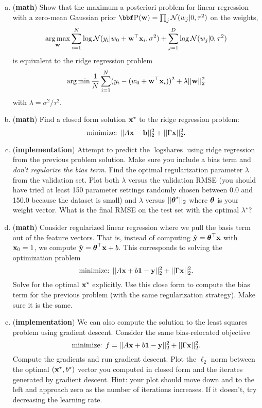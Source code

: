\documentclass[12pt,letterpaper,fleqn]{hmcpset}
\begin{document}
\begin{enumerate}[(a)]
    \item (\textbf{math}) Show that the maximum a posteriori problem for
        linear regression with a zero-mean Gaussian prior $\PP(\ww) = \prod_j
        \Nc(w_j | 0, \tau^2)$ on the weights,
        \[
            \operatorname*{arg\,max}_{\bf w} \sum_{i=1}^N \log{\cal N}(y_i | w_0 + {\bf w}^\top{\bf x}_i, \sigma^2) + \sum_{j=1}^D \log{\cal N}(w_j | 0, \tau^2)
        \]
        is equivalent to the ridge regression problem
        \[
            \operatorname*{arg\,min} \frac{1}{N}\sum_{i=1}^N (y_i - (w_0 + {\bf w}^\top{\bf x}_i))^2 + \lambda ||{\bf w}||_2^2
        \]
        with $\lambda = \sigma^2 / \tau^2$.
    \item (\textbf{math}) Find a closed form solution ${\bf x}^\star$ to the ridge regression
        problem:
        \[
            \text{minimize: } ||A{\bf x} - {\bf b}||_2^2 + ||\Gamma{\bf x}||_2^2.
        \]
    \item (\textbf{implementation}) Attempt to predict the $\log\text{shares}$ using ridge
        regression from the previous problem solution. Make sure you include a bias
        term and \textit{don't regularize the bias term}.
        Find the optimal regularization parameter $\lambda$
        from the validation set. Plot both $\lambda$ versus the validation RMSE (you should have
        tried at least 150 parameter settings randomly chosen between 0.0 and 150.0 because
        the dataset is small)
        and $\lambda$ versus $||\hbox{\boldmath$\theta$}^\star||_2$ where $\hbox{\boldmath$\theta$}$ is your weight vector.
        What is the final RMSE on the test set with the optimal $\lambda^\star$?
    \item (\textbf{math}) Consider regularized linear regression where we pull the
        basis term out of the feature vectors. That is, instead of computing $\hat{{\bf y}}
        = \hbox{\boldmath$\theta$}^\top{\bf x}$ with ${\bf x}_0 = 1$, we compute $\hat{{\bf y}} = \hbox{\boldmath$\theta$}^\top{\bf x} + b$.
        This corresponds to solving the optimization problem
        \[
            \text{minimize: } ||A{\bf x} + b{\bf 1} - {\bf y}||_2^2 + ||\Gamma{\bf x}||_2^2.
        \]
        Solve for the optimal ${\bf x}^\star$ explicitly. Use this close form to compute the
        bias term for the previous problem (with the same regularization strategy). Make
        sure it is the same.
    \item (\textbf{implementation}) We can also compute the solution to the least squares
        problem using gradient descent. Consider the same bias-relocated objective
        \[
            \text{minimize: } f = ||A{\bf x} + b{\bf 1} - {\bf y}||_2^2 + ||\Gamma{\bf x}||_2^2.
        \]
        Compute the gradients and run gradient descent. Plot the $\ell_2$ norm
        between the optimal $({\bf x}^\star, b^\star)$ vector you computed in closed form
        and the iterates generated by gradient descent. Hint: your plot should move
        down and to the left and approach zero as the number of iterations increases. If
        it doesn't, try decreasing the learning rate.
\end{enumerate}
\end{document}
